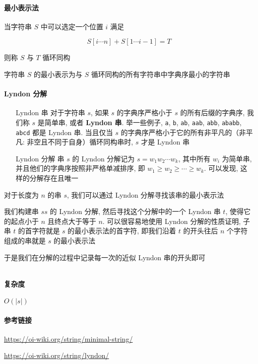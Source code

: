 \paragraph{最小表示法}

当字符串 \(S\) 中可以选定一个位置 \(i\) 满足

\[
    S[i\cdots n]+S[1\cdots i-1]=T
\]

则称 \(S\) 与 \(T\) 循环同构

字符串 \(S\) 的最小表示为与 \(S\) 循环同构的所有字符串中字典序最小的字符串

\paragraph{Lyndon 分解}

\begin{enumerate}
    \item[Lyndon 串] 对于字符串 \(s\), 如果 \(s\) 的字典序严格小于 \(s\) 的所有后缀的字典序, 我们称 \(s\) 是简单串, 或者 \textbf{Lyndon 串}. 举一些例子, \verb|a|, \verb|b|, \verb|ab|, \verb|aab|, \verb|abb|, \verb|ababb|, \verb|abcd| 都是 Lyndon 串. 当且仅当 \(s\) 的字典序严格小于它的所有非平凡的（非平凡: 非空且不同于自身）循环同构串时, \(s\) 才是 Lyndon 串
    \item[Lyndon 分解] 串 \(s\) 的 Lyndon 分解记为 \(s=w_1w_2\cdots w_k\), 其中所有 \(w_i\) 为简单串, 并且他们的字典序按照非严格单减排序, 即 \(w_1\ge w_2\ge\cdots\ge w_k\). 可以发现, 这样的分解存在且唯一
\end{enumerate}

对于长度为 \(n\) 的串 \(s\), 我们可以通过 Lyndon 分解寻找该串的最小表示法

我们构建串 \(ss\) 的 Lyndon 分解, 然后寻找这个分解中的一个 Lyndon 串 \(t\), 使得它的起点小于 \(n\) 且终点大于等于 \(n\). 可以很容易地使用 Lyndon 分解的性质证明, 子串 \(t\) 的首字符就是 \(s\) 的最小表示法的首字符, 即我们沿着 \(t\) 的开头往后 \(n\) 个字符组成的串就是 \(s\) 的最小表示法

于是我们在分解的过程中记录每一次的近似 Lyndon 串的开头即可

\inputminted{cpp}{src/src/min_cyclic_string.txt}

\paragraph{复杂度}

\(O(|s|)\)

\paragraph{参考链接}

\url{https://oi-wiki.org/string/minimal-string/}

\url{https://oi-wiki.org/string/lyndon/}
